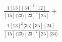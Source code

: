 \documentclass[varwidth, border=5pt]{standalone}
\begin{document}
\begin{my}
$\begin{gathered}
\scriptscriptstyle\frac{1[13][34]^2[12]}{[15]⟨23⟩[23]^2[25]}+\\
\scriptscriptstyle\frac{1[13]^2⟨35⟩[35][24]}{[15]⟨23⟩[23]^2[25]⟨34⟩}\phantom{+}
\end{gathered}$
\end{my}
\end{document}
